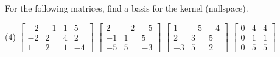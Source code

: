 \begin{exercise}
For the following matrices, find a basis for the kernel (nullspace).
\begin{tasks}(4)
\task
$\begin{bmatrix}
-2 & -1 & 1 & 5 \\
-2 & 2 & 4 & 2 \\
1 & 2 & 1 & -4
\end{bmatrix}$
\task
$
\begin{bmatrix}
2 & -2 & -5 \\
-1 & 1 & 5 \\
-5 & 5 & -3
\end{bmatrix}$
\task
$
\begin{bmatrix}
1 & -5 & -4 \\
2 & 3 & 5 \\
-3 & 5 & 2
\end{bmatrix}$
\task
$
\begin{bmatrix}
0 & 4 & 4 \\
0 & 1 & 1 \\
0 & 5 & 5
\end{bmatrix}$
\end{tasks}
\end{exercise}


